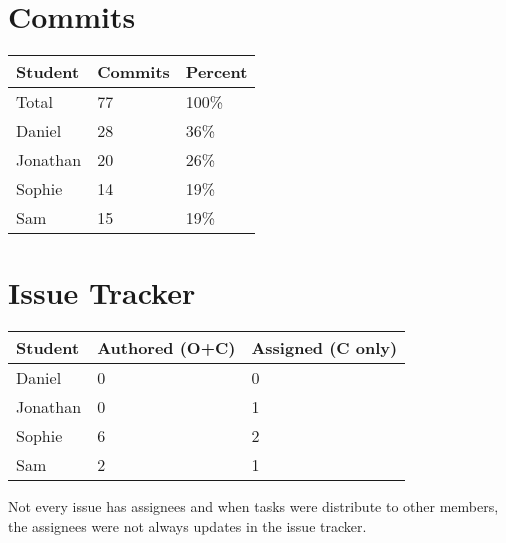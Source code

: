 \documentclass{article}
\begin{document}
\section{Commits}

\begin{table}[H]
\centering
\begin{tabular}{lll}
\toprule
\textbf{Student} & \textbf{Commits} & \textbf{Percent}\\
\midrule
Total & 77 & 100\% \\
Daniel & 28 & 36\% \\
Jonathan & 20 & 26\% \\
Sophie & 14 & 19\% \\
Sam & 15 & 19\% \\
\bottomrule
\end{tabular}
\end{table}

\section{Issue Tracker}

\begin{table}[H]
\centering
\begin{tabular}{lll}
\toprule
\textbf{Student} & \textbf{Authored (O+C)} & \textbf{Assigned (C only)}\\
\midrule
Daniel & 0 & 0 \\
Jonathan & 0 & 1 \\
Sophie & 6 & 2 \\
Sam & 2 & 1 \\
\bottomrule
\end{tabular}
\end{table}

Not every issue has assignees and when tasks were distribute to other members, the assignees were not always updates in the issue tracker.
\end{document}
